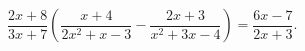 \begin{ex}[type=equation]
	\begin{condition}
		$\dfrac{2x + 8}{3x + 7}\left(\dfrac{x + 4}{2x^2 + x-3} - \dfrac{2x + 3}{x^2 + 3x - 4}\right) = \dfrac{6x - 7}{2x + 3}.$
	\end{condition}
\end{ex}